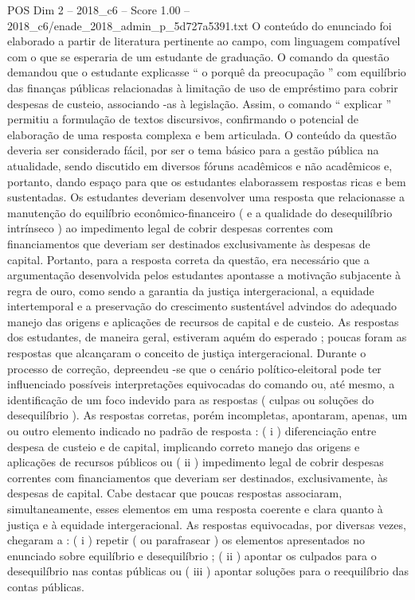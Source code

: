 \begin{textsample}{POS Dim 2 – 2018\_c6 – Score 1.00 – 2018\_c6/enade\_2018\_admin\_p\_5d727a5391.txt}
O conteúdo do enunciado foi elaborado a partir de literatura pertinente ao campo, com linguagem compatível com o que se esperaria de um estudante de graduação.
O comando da questão demandou que o estudante explicasse “ o porquê da preocupação ” com equilíbrio das finanças públicas relacionadas à limitação de uso de empréstimo para cobrir despesas de custeio, associando -as à legislação.
Assim, o comando “ explicar ” permitiu a formulação de textos discursivos, confirmando o potencial de elaboração de uma resposta complexa e bem articulada.
O conteúdo da questão deveria ser considerado fácil, por ser o tema básico para a gestão pública na atualidade, sendo discutido em diversos fóruns acadêmicos e não acadêmicos e, portanto, dando espaço para que os estudantes elaborassem respostas ricas e bem sustentadas.
Os estudantes deveriam desenvolver uma resposta que relacionasse a manutenção do equilíbrio econômico-financeiro ( e a qualidade do desequilíbrio intrínseco ) ao impedimento legal de cobrir despesas correntes com financiamentos que deveriam ser destinados exclusivamente às despesas de capital.
Portanto, para a resposta correta da questão, era necessário que a argumentação desenvolvida pelos estudantes apontasse a motivação subjacente à regra de ouro, como sendo a garantia da justiça intergeracional, a equidade intertemporal e a preservação do crescimento sustentável advindos do adequado manejo das origens e aplicações de recursos de capital e de custeio.
As respostas dos estudantes, de maneira geral, estiveram aquém do esperado ; poucas foram as respostas que alcançaram o conceito de justiça intergeracional.
Durante o processo de correção, depreendeu -se que o cenário político-eleitoral pode ter influenciado possíveis interpretações equivocadas do comando ou, até mesmo, a identificação de um foco indevido para as respostas ( culpas ou soluções do desequilíbrio ).
As respostas corretas, porém incompletas, apontaram, apenas, um ou outro elemento indicado no padrão de resposta : ( i ) diferenciação entre despesa de custeio e de capital, implicando correto manejo das origens e aplicações de recursos públicos ou ( ii ) impedimento legal de cobrir despesas correntes com financiamentos que deveriam ser destinados, exclusivamente, às despesas de capital.
Cabe destacar que poucas respostas associaram, simultaneamente, esses elementos em uma resposta coerente e clara quanto à justiça e à equidade intergeracional.
As respostas equivocadas, por diversas vezes, chegaram a : ( i ) repetir ( ou parafrasear ) os elementos apresentados no enunciado sobre equilíbrio e desequilíbrio ; ( ii ) apontar os culpados para o desequilíbrio nas contas públicas ou ( iii ) apontar soluções para o reequilíbrio das contas públicas.

\end{textsample}
